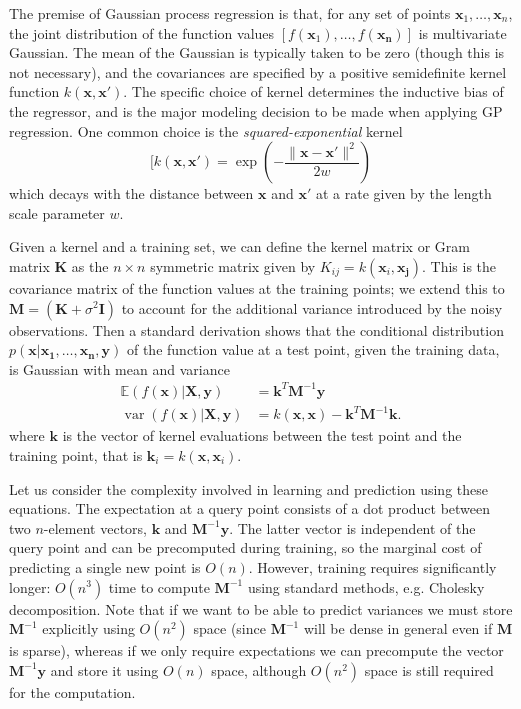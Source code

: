 \documentclass{article}
\DeclareMathOperator*{\var}{var}
\begin{document}
The premise of Gaussian process regression is that, for any set of points $\mathbf{x}_1, \ldots, \mathbf{x}_n$, the joint distribution of the function values $[f(\mathbf{x}_1), \ldots, f(\mathbf{x_n})]$ is multivariate Gaussian. The mean of the Gaussian is typically taken to be zero (though this is not necessary), and the covariances are specified by a positive semidefinite kernel function $k(\mathbf{x}, \mathbf{x'})$. The specific choice of kernel determines the inductive bias of the regressor, and is the major modeling decision to be made when applying GP regression. One common choice is the {\em squared-exponential} kernel\begin{equation}[k(\mathbf{x}, \mathbf{x'}) = \exp\left (- \frac{ \|\mathbf{x} - \mathbf{x'}\|^2 }{2w} \right)\end{equation}
which decays with the distance between $\mathbf{x}$ and $\mathbf{x'}$ at a rate given by the length scale parameter $w$. 

Given a kernel and a training set, we can define the kernel matrix or Gram matrix $\mathbf{K}$ as the $n \times n$ symmetric matrix given by $K_{ij} = k(\mathbf{x}_i, \mathbf{x_j})$. This is the covariance matrix of the function values at the training points; we extend this to $\mathbf{M} = (\mathbf{K} + \sigma^2\mathbf{I})$ to account for the additional variance introduced by the noisy observations. Then a standard derivation \cite{rasmussen06} shows that the conditional distribution $p(\mathbf{x} | \mathbf{x_1}, \ldots, \mathbf{x_n}, \mathbf{y})$ of the function value at a test point, given the training data, is Gaussian with mean and variance
\begin{align}
\mathbb{E}(f(\mathbf{x}) | \mathbf{X}, \mathbf{y}) &= \mathbf{k}^T \mathbf{M}^{-1} \mathbf{y}\\
\var(f(\mathbf{x}) | \mathbf{X}, \mathbf{y}) &= k(\mathbf{x}, \mathbf{x}) - \mathbf{k}^T \mathbf{M}^{-1} \mathbf{k}.
\end{align}
where $\mathbf{k}$ is the vector of kernel evaluations between the test point and the training point, that is $\mathbf{k}_i = k(\mathbf{x},\mathbf{x}_i)$. 

Let us consider the complexity involved in learning and prediction using these equations. The expectation at a query point consists of a dot product between two $n$-element vectors, $\mathbf{k}$ and $\mathbf{M}^{-1} \mathbf{y}$. The latter vector is independent of the query point and can be precomputed during training, so the marginal cost of predicting a single new point is $O(n)$. However, training requires significantly longer: $O(n^3)$ time to compute $\mathbf{M}^{-1}$ using standard methods, e.g. Cholesky decomposition. Note that if we want to be able to predict variances we must store $\mathbf{M}^{-1}$ explicitly using $O(n^2)$ space (since $\mathbf{M}^{-1}$ will be dense in general even if $\mathbf{M}$ is sparse), whereas if we only require expectations we can precompute the vector $\mathbf{M}^{-1}\mathbf{y}$ and store it using $O(n)$ space, although $O(n^2)$ space is still required for the computation.
\end{document}
